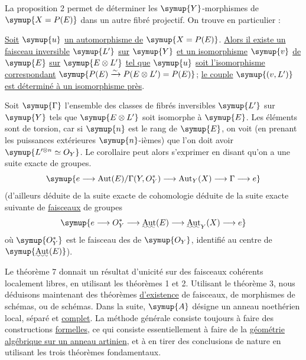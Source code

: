La proposition 2 permet de déterminer les $\symup{Y}$-morphismes de $\symup{X=P(E)}$
dans un autre fibré projectif. On trouve en particulier :

 \uline{Soit} $\symup{u}$ \uline{un automorphisme de} $\symup{X=P(E)}$. \uline{Alors il
existe un faisceau inversible} $\symup{L'}$ \uline{sur} $\symup{Y}$ \uline{et un isomorphisme} $\symup{v}$ \uline{de} $\symup{E}$ \uline{sur}
$\symup{E\otimes L'}$ \uline{tel que} $\symup{u}$ \uline{soit l'isomorphisme correspondant}
$\symup{P(E)\xrightarrow{\sim}P(E\otimes L')=P(E)}$;
\uline{le couple} $\symup{(v,L')}$ \uline{est déterminé à un isomorphisme près}.

Soit $\symup{\Gamma}$ l'ensemble des classes de fibrés inversibles $\symup{L'}$ sur $\symup{Y}$ tels
que $\symup{E\otimes L'}$ soit isomorphe à $\symup{E}$. Les éléments sont de torsion, car si
$\symup{n}$ est le rang de $\symup{E}$, on voit (en prenant les puissances extérieures
$\symup{n}$-ièmes) que l'on doit avoir $\symup{L'^{\otimes n}\simeq O_Y}$. Le corollaire peut
alors s'exprimer en disant qu'on a une suite exacte de groupes.
\[
  \symup{e\longrightarrow
  \operatorname{Aut}(E)/\Gamma(Y,O_Y^*)
  \longrightarrow \operatorname{Aut}_Y(X)
  \longrightarrow \Gamma\longrightarrow e}
\]
(d'ailleurs déduite de la suite exacte de cohomologie déduite de la suite
exacte suivante de \uline{faisceaux} de groupes
\[
  \symup{e\longrightarrow O_Y^*
  \longrightarrow \mathop{\text{\uwave{Aut}}}\nolimits(E)
  \longrightarrow \mathop{\text{\uwave{Aut}}}\nolimits_Y(X)
  \longrightarrow e}
\]
où $\symup{O_Y^*}$ est le faisceau des  de $\symup{O_Y}$, identifié au centre
de $\symup{\mathop{\text{\uwave{Aut}}}\nolimits(E)}$).


Le théorème 7 donnait un résultat d'unicité sur des faisceaux cohérents
localement libres, en utilisant les théorèmes 1 et 2. Utilisant le théorème 3,
nous déduisons maintenant des théorèmes \uline{d'existence} de faisceaux, de morphismes
de schémas, ou de schémas. Dans la suite, $\symup{A}$ désigne un anneau noethérien
local, séparé et \uline{complet}. La méthode générale consiste toujours à faire des
constructions \uline{formelles}, ce qui consiste essentiellement à faire de la
\uline{géométrie algébrique sur un anneau artinien}, et à en tirer des conclusions de
nature  en utilisant les trois théorèmes fondamentaux.

